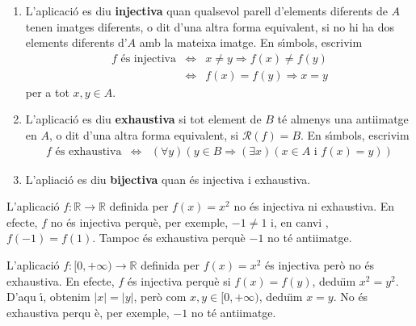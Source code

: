 \begin{enumerate}
\item L'aplicaci\'{o} es diu \textbf{injectiva} quan qualsevol parell
d'elements diferents de $A$ tenen imatges diferents, o dit d'una altra forma
equivalent, si no hi ha dos elements diferents d'$A$ amb la mateixa imatge.
En s\'{\i}mbols, escrivim%
\begin{equation*}
\begin{array}{lll}
f\text{ \'{e}s injectiva} & \Longleftrightarrow & x\neq y\Longrightarrow
f(x)\neq f(y) \\
& \Longleftrightarrow & f(x)=f(y)\Longrightarrow x=y%
\end{array}
\end{equation*}
per a tot $x,y\in A$.

\item L'aplicaci\'{o} es diu \textbf{exhaustiva} si tot element de $B$ t\'{e}
almenys una antiimatge en $A$, o dit d'una altra forma equivalent, si $%
\mathcal{R}\left( f\right) =B$. En s\'{\i}mbols, escrivim%
\begin{equation*}
\begin{array}{lll}
f\text{ \'{e}s exhaustiva} & \Longleftrightarrow & \left( \forall y\right)
\left( y\in B\Longrightarrow\left( \exists x\right) \left( x\in A\text{ i }%
f(x)=y\right) \right)%
\end{array}
\end{equation*}

\item L'apliaci\'{o} es diu \textbf{bijectiva} quan \'{e}s injectiva i
exhaustiva.
\end{enumerate}

\begin{exemple}
L'aplicaci\'{o} $f:\mathbb{R}\longrightarrow\mathbb{R}$ definida per $%
f(x)=x^{2}$ no \'{e}s injectiva ni exhaustiva. En efecte, $f$ no \'{e}s
injectiva perqu\`{e}, per exemple, $-1\neq1$ i, en canvi , $f(-1)=f(1)$.
Tampoc \'{e}s exhaustiva perqu\`{e} $-1$ no t\'{e} antiimatge.
\end{exemple}

\begin{exemple}
L'aplicaci\'{o} $f:[0,+\infty)\longrightarrow\mathbb{R}$ definida per $%
f(x)=x^{2}$ \'{e}s injectiva per\`{o} no \'{e}s exhaustiva. En efecte, $f$
\'{e}s injectiva perqu\`{e} si $f(x)=f(y)$, dedu\"{\i}m $x^{2}=y^{2}$. D'aqu%
\'{\i}, obtenim $\left\vert x\right\vert =\left\vert y\right\vert $, per\`{o}
com $x,y\in\lbrack0,+\infty)$, dedu\"{\i}m $x=y$. No \'{e}s exhaustiva perqu%
\`{e}, per exemple, $-1$ no t\'{e} antiimatge.
\end{exemple}

